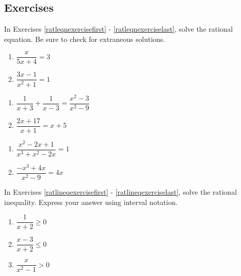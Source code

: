 \subsection{Exercises}

In Exercises \ref{ratleqnexercisefirst} - \ref{ratleqnexerciselast},  solve the rational equation.  Be sure to check for extraneous solutions.

\begin{multicols}{2}
\begin{enumerate}

\item $\dfrac{x}{5x + 4} = 3$ \label{ratleqnexercisefirst}
\item $\dfrac{3x - 1}{x^{2} + 1} = 1$

\setcounter{HW}{\value{enumi}}
\end{enumerate}
\end{multicols}

\begin{multicols}{2}
\begin{enumerate}
\setcounter{enumi}{\value{HW}}

\item $\dfrac{1}{x + 3} + \dfrac{1}{x - 3} = \dfrac{x^{2} - 3}{x^{2} - 9}$
\item $\dfrac{2x + 17}{x + 1} = x + 5$

\setcounter{HW}{\value{enumi}}
\end{enumerate}
\end{multicols}

\begin{multicols}{2}
\begin{enumerate}
\setcounter{enumi}{\value{HW}}
\item $\dfrac{x^{2} - 2x + 1}{x^{3} + x^{2} - 2x} = 1$
\item $\dfrac{-x^{3} + 4x}{x^{2} - 9} = 4x$  \label{ratleqnexerciselast}

\setcounter{HW}{\value{enumi}}
\end{enumerate}
\end{multicols}

In Exercises \ref{ratlineqexercisefirst} - \ref{ratlineqexerciselast}, solve the rational inequality.  Express your answer using interval notation.

\begin{multicols}{3}
\begin{enumerate}
\setcounter{enumi}{\value{HW}}

\item $\dfrac{1}{x + 2} \geq 0$ \label{ratlineqexercisefirst}
\item $\dfrac{x - 3}{x + 2} \leq 0$
\item $\dfrac{x}{x^{2} - 1} > 0$

\setcounter{HW}{\value{enumi}}
\end{enumerate}
\end{multicols}

